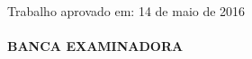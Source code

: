 %
% 
%
\begin{folhadeaprovacao}

  \begin{center}
    {\ABNTEXchapterfont\bfseries\large\imprimirautor}

    \vspace*{\fill}\vspace*{\fill}
    \begin{center}
      \ABNTEXchapterfont\bfseries\Large\imprimirtitulo
    \end{center}
    \vspace*{\fill}
    
    \hspace{.45\textwidth}
    \begin{minipage}{\textwidth}
        \imprimirpreambulo       
    \end{minipage}%
    \vspace{1cm}
    Trabalho aprovado em: 14 de maio de 2016 \\
    \imprimirlocal
    \\
    \vspace{10mm}
    \uppercase{\textbf{banca examinadora}} 
   \end{center}     

      
  
\end{folhadeaprovacao}

